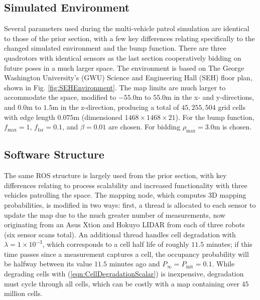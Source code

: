 \documentclass[smallextended]{svjour3}       %
\newcommand{\refeqn}[1]{(\ref{eqn:#1})}
\begin{document}
\subsection{Simulated Environment}

Several parameters used during the multi-vehicle patrol simulation are identical to those of the prior section, with a few key differences relating specifically to the changed simulated environment and the bump function. There are three quadrotors with identical sensors as the last section cooperatively bidding on future poses in a much larger space. The environment is based on The George Washington University's (GWU) Science and Engineering Hall (SEH) floor plan, shown in Fig. \ref{fig:SEHEnvironment}. The map limits are much larger to accommodate the space, modified to $-55.0$m to $55.0$m in the x- and y-directions, and $0.0$m to $1.5$m in the z-direction, producing a total of $45,255,504$ grid cells with edge length $0.075$m (dimensioned $1468\times1468\times21$). For the bump function, $f_\text{max}=1$, $f_\text{far}=0.1$, and $\beta=0.01$ are chosen. For bidding $\rho_\text{max}=3.0$m is chosen.


\subsection{Software Structure}

The same ROS structure is largely used from the prior section, with key differences relating to process scalability and increased functionality with three vehicles patrolling the space. The mapping node, which computes 3D mapping probabilities, is modified in two ways: first, a thread is allocated to each sensor to update the map due to the much greater number of measurements, now originating from an Asus Xtion and Hokuyo LIDAR from each of three robots (six sensor scans total). An additional thread handles cell degradation with $\lambda=1\times10^{-3}$, which corresponds to a cell half life of roughly $11.5$ minutes; if this time passes since a measurement captures a cell, the occupancy probability will be halfway between its value $11.5$ minutes ago and $P_\infty=P_\text{init}=0.1$. While degrading cells with \refeqn{CellDegradationScalar} is inexpensive, degradation must cycle through all cells, which can be costly with a map containing over $45$ million cells. 
\end{document}

